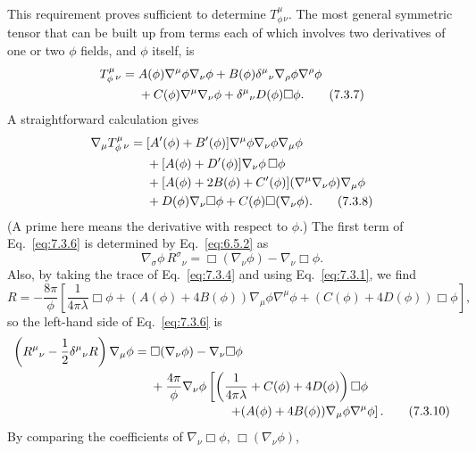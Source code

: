 This requirement proves sufficient to determine \(T_\phi^\mu{}_\nu\). The
most general symmetric tensor that can be built up from terms each of which
involves two derivatives of one or two \(\phi\) fields, and \(\phi\) itself,
is
\begin{align}
  T_\phi^\mu{}_\nu
  ={}&
  A(\phi)\nabla^\mu\phi\nabla_\nu\phi
  +B(\phi)\delta^\mu{}_\nu
   \nabla_\rho\phi\nabla^\rho\phi
  \notag\\
  &+
  C(\phi)\nabla^\mu\nabla_\nu\phi
  +\delta^\mu{}_\nu D(\phi)\Box\phi.
  \tag{7.3.7}\label{eq:7.3.7}
\end{align}
A straightforward calculation gives
\begin{align}
  \nabla_\mu T_\phi^\mu{}_\nu
  ={}&
  [A'(\phi)+B'(\phi)]
  \nabla^\mu\phi\nabla_\nu\phi\nabla_\mu\phi
  \notag\\
  &+
  [A(\phi)+D'(\phi)]\nabla_\nu\phi\,\Box\phi
  \notag\\
  &+
  [A(\phi)+2B(\phi)+C'(\phi)]
  (\nabla^\mu\nabla_\nu\phi)\nabla_\mu\phi
  \notag\\
  &+
  D(\phi)\nabla_\nu\Box\phi
  +C(\phi)\Box(\nabla_\nu\phi).
  \tag{7.3.8}\label{eq:7.3.8}
\end{align}
(A prime here means the derivative with respect to \(\phi\).) The first term
of Eq.~\eqref{eq:7.3.6} is determined by Eq.~\eqref{eq:6.5.2} as
\begin{equation}
  \nabla_\sigma\phi\,R^\sigma{}_\nu
  =
  \Box(\nabla_\nu\phi)-\nabla_\nu\Box\phi.
  \tag{7.3.9}\label{eq:7.3.9}
\end{equation}
Also, by taking the trace of Eq.~\eqref{eq:7.3.4} and using
Eq.~\eqref{eq:7.3.1}, we find
\[
  R
  =
  -\frac{8\pi}{\phi}
  \left[
    \frac{1}{4\pi\lambda}\Box\phi
    +(A(\phi)+4B(\phi))\nabla_\mu\phi\nabla^\mu\phi
    +(C(\phi)+4D(\phi))\Box\phi
  \right],
\]
so the left-hand side of Eq.~\eqref{eq:7.3.6} is
\begin{align}
  \left(R^\mu{}_\nu-\frac12\delta^\mu{}_\nu R\right)
  \nabla_\mu\phi
  ={}&
  \Box(\nabla_\nu\phi)-\nabla_\nu\Box\phi
  \notag\\
  &+
  \frac{4\pi}{\phi}\nabla_\nu\phi
  \left[
    \left(
      \frac{1}{4\pi\lambda}
      +C(\phi)+4D(\phi)
    \right)\Box\phi
  \right.
  \notag\\[-2pt]
  &\hspace{6.2em}\left.
    +(A(\phi)+4B(\phi))
     \nabla_\mu\phi\nabla^\mu\phi
  \right].
  \tag{7.3.10}\label{eq:7.3.10}
\end{align}
By comparing the coefficients of
\(\nabla_\nu\Box\phi\), \(\Box(\nabla_\nu\phi)\),
